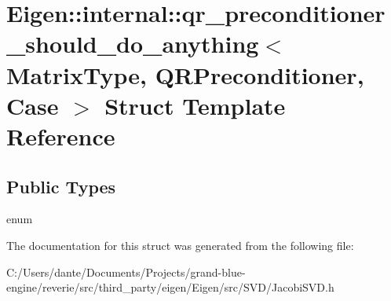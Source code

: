 \hypertarget{struct_eigen_1_1internal_1_1qr__preconditioner__should__do__anything}{}\section{Eigen\+::internal\+::qr\+\_\+preconditioner\+\_\+should\+\_\+do\+\_\+anything$<$ Matrix\+Type, Q\+R\+Preconditioner, Case $>$ Struct Template Reference}
\label{struct_eigen_1_1internal_1_1qr__preconditioner__should__do__anything}
\subsection*{Public Types}
\begin{DoxyCompactItemize}
\item 
\mbox{\label{struct_eigen_1_1internal_1_1qr__preconditioner__should__do__anything_a52cd84ec8c4042bd0f3d50dc2e752561}} 
enum 
\end{DoxyCompactItemize}


The documentation for this struct was generated from the following file\+:\begin{DoxyCompactItemize}
\item 
C\+:/\+Users/dante/\+Documents/\+Projects/grand-\/blue-\/engine/reverie/src/third\+\_\+party/eigen/\+Eigen/src/\+S\+V\+D/Jacobi\+S\+V\+D.\+h\end{DoxyCompactItemize}
